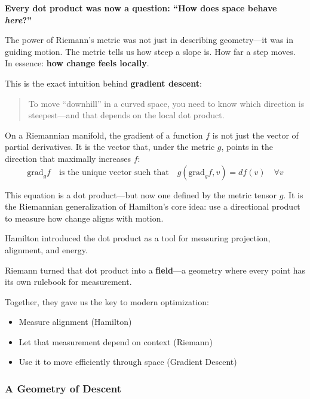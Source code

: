 \textbf{Every dot product was now a question: “How does space behave \textit{here}?”}

The power of Riemann’s metric was not just in describing geometry—it was in guiding motion.  The metric tells us how steep a slope is. How far a step moves.  In essence: \textbf{how change feels locally}.

This is the exact intuition behind \textbf{gradient descent}:

\begin{quote}
To move “downhill” in a curved space, you need to know which direction is steepest—and that depends on the local dot product.
\end{quote}

On a Riemannian manifold, the gradient of a function \( f \) is not just the vector of partial derivatives. It is the vector that, under the metric \( g \), points in the direction that maximally increases \( f \):
\[
\text{grad}_g f \quad \text{is the unique vector such that} \quad g(\text{grad}_g f, v) = df(v) \quad \forall v
\]

This equation is a dot product—but now one defined by the metric tensor \( g \). It is the Riemannian generalization of Hamilton’s core idea: use a directional product to measure how change aligns with motion.

\begin{tcolorbox}[colback=blue!5!white, colframe=blue!50!black,
title={Sidebar: Hamilton’s Dot Product Grows Up}]
Hamilton introduced the dot product as a tool for measuring projection, alignment, and energy.

Riemann turned that dot product into a \textbf{field}—a geometry where every point has its own rulebook for measurement.

Together, they gave us the key to modern optimization:
\begin{itemize}
  \item Measure alignment (Hamilton)
  \item Let that measurement depend on context (Riemann)
  \item Use it to move efficiently through space (Gradient Descent)
\end{itemize}
\end{tcolorbox}

\subsubsection*{A Geometry of Descent}

